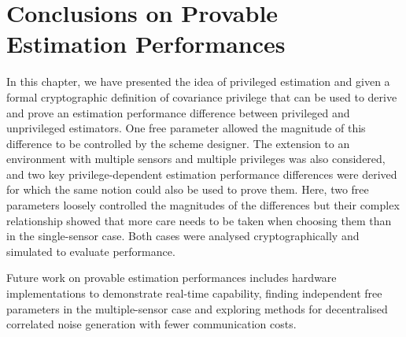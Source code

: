 \section{Conclusions on Provable Estimation Performances}\label{sec:priv_estimation:conclusion}
In this chapter, we have presented the idea of privileged estimation and given a formal cryptographic definition of covariance privilege that can be used to derive and prove an estimation performance difference between privileged and unprivileged estimators. One free parameter allowed the magnitude of this difference to be controlled by the scheme designer. The extension to an environment with multiple sensors and multiple privileges was also considered, and two key privilege-dependent estimation performance differences were derived for which the same notion could also be used to prove them. Here, two free parameters loosely controlled the magnitudes of the differences but their complex relationship showed that more care needs to be taken when choosing them than in the single-sensor case. Both cases were analysed cryptographically and simulated to evaluate performance.

Future work on provable estimation performances includes hardware implementations to demonstrate real-time capability, finding independent free parameters in the multiple-sensor case and exploring methods for decentralised correlated noise generation with fewer communication costs.